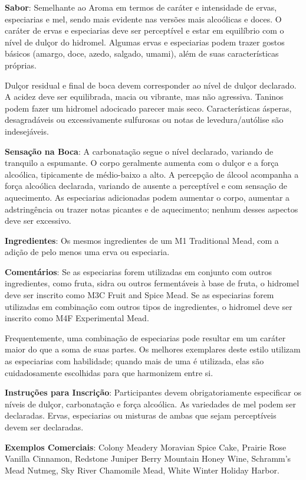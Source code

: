 \textbf{Sabor}: Semelhante ao Aroma em termos de caráter e intensidade de ervas, especiarias e mel, sendo mais evidente nas versões mais alcoólicas e doces. O caráter de ervas e especiarias deve ser perceptível e estar em equilíbrio com o nível de dulçor do hidromel. Algumas ervas e especiarias podem trazer gostos básicos (amargo, doce, azedo, salgado, umami), além de suas características próprias.

Dulçor residual e final de boca devem corresponder ao nível de dulçor declarado. A acidez deve ser equilibrada, macia ou vibrante, mas não agressiva. Taninos podem fazer um hidromel adocicado parecer mais seco. Características ásperas, desagradáveis ou excessivamente sulfurosas ou notas de levedura/autólise são indesejáveis.

\textbf{Sensação na Boca}: A carbonatação segue o nível declarado, variando de tranquilo a espumante. O corpo geralmente aumenta com o dulçor e a força alcoólica, tipicamente de médio-baixo a alto. A percepção de álcool acompanha a força alcoólica declarada, variando de ausente a perceptível e com sensação de aquecimento. As especiarias adicionadas podem aumentar o corpo, aumentar a adstringência ou trazer notas picantes e de aquecimento; nenhum desses aspectos deve ser excessivo.

\textbf{Ingredientes}: Os mesmos ingredientes de um M1 Traditional Mead, com a adição de pelo menos uma erva ou especiaria.

\textbf{Comentários}: Se as especiarias forem utilizadas em conjunto com outros ingredientes, como fruta, sidra ou outros fermentáveis à base de fruta, o hidromel deve ser inscrito como M3C Fruit and Spice Mead. Se as especiarias forem utilizadas em combinação com outros tipos de ingredientes, o hidromel deve ser inscrito como M4F Experimental Mead.

Frequentemente, uma combinação de especiarias pode resultar em um caráter maior do que a soma de suas partes. Os melhores exemplares deste estilo utilizam as especiarias com habilidade; quando mais de uma é utilizada, elas são cuidadosamente escolhidas para que harmonizem entre si.

\textbf{Instruções para Inscrição}: Participantes devem obrigatoriamente especificar os níveis de dulçor, carbonatação e força alcoólica. As variedades de mel podem ser declaradas. Ervas, especiarias ou misturas de ambas que sejam perceptíveis devem ser declaradas.

\textbf{Exemplos Comerciais}: Colony Meadery Moravian Spice Cake, Prairie Rose Vanilla Cinnamon, Redstone Juniper Berry Mountain Honey Wine, Schramm's Mead Nutmeg, Sky River Chamomile Mead, White Winter Holiday Harbor.
